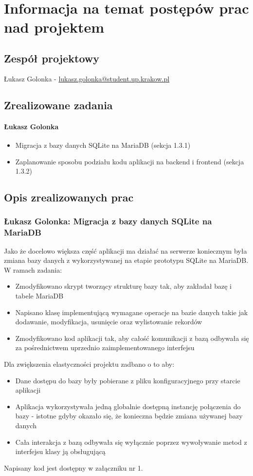 \documentclass[12pt,a4paper,oneside]{article}
\theoremstyle{definition}
\numberwithin{equation}{section}
\begin{document}
\tableofcontents


\newpage

\section{Informacja na temat postępów prac nad projektem}
\subsection{Zespół projektowy}
Łukasz Golonka - \href{mailto:lukasz.golonka@student.up.krakow.pl}{lukasz.golonka@student.up.krakow.pl}
\subsection{Zrealizowane zadania}
\paragraph{Łukasz Golonka}
\begin{itemize}
\item Migracja z bazy danych SQLite na MariaDB (sekcja 1.3.1)
\item Zaplanowanie sposobu podziału kodu aplikacji na backend i frontend (sekcja 1.3.2)
\end{itemize}

\subsection {Opis zrealizowanych prac}
\subsubsection{Łukasz Golonka: Migracja z bazy danych SQLite na MariaDB}
Jako że docelowo większa część aplikacji ma działać na serwerze koniecznym była zmiana bazy danych z wykorzystywanej na etapie prototypu SQLite na MariaDB. W ramach zadania:
\begin{itemize}
	\item Zmodyfikowano skrypt tworzący strukturę bazy tak, aby zakładał bazę i tabele MariaDB
	\item Napisano klasę implementującą wymagane operacje na bazie danych takie jak dodawanie, modyfikacja, usunięcie oraz wylistowanie rekordów
	\item Zmodyfikowano kod aplikacji tak, aby całość komunikacji z  bazą odbywała się za pośrednictwem uprzednio zaimplementowanego interfejsu
\end{itemize}
Dla zwiększenia elastyczności projektu zadbano o to aby:
\begin{itemize}
	\item Dane dostępu do bazy były pobierane z pliku konfiguracyjnego przy starcie aplikacji
	\item Aplikacja wykorzystywała jedną globalnie dostępną instancję połączenia do bazy - istotne gdyby okazało się, że konieczna będzie zmiana używanej bazy danych
	\item Cała interakcja z bazą odbywała się wyłącznie poprzez wywoływanie metod  z interfejsu klasy ją obsługującą
\end{itemize}
Napisany kod jest dostępny w załączniku nr 1.
\end{document}
